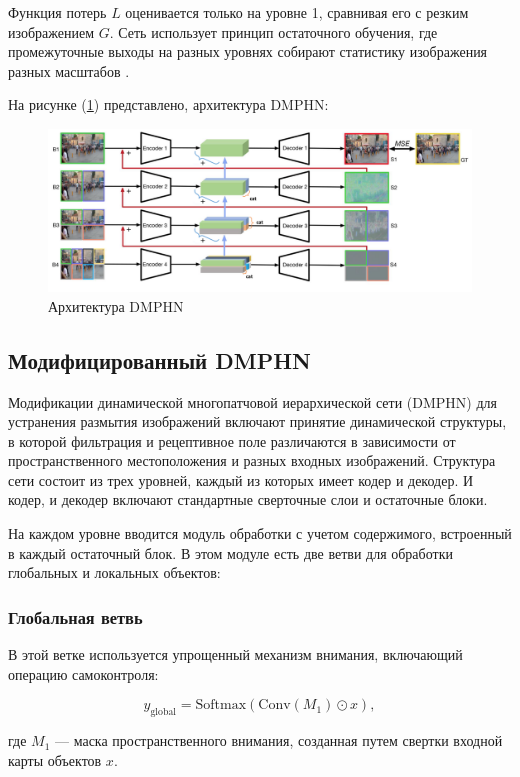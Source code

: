 Функция потерь \(L\) оценивается только на уровне 1, сравнивая его с резким изображением \(G\). Сеть использует принцип остаточного обучения, где промежуточные выходы на разных уровнях собирают статистику изображения разных масштабов \cite{zhang2019deep}.

На рисунке (\ref{fig:dmphn}) представлено, архитектура DMPHN: 
\begin{figure}[H]
	\centering
	\includegraphics[width=0.8\linewidth]{assets/DMPHN.png}
	\caption{Архитектура DMPHN}
	\label{fig:dmphn}
\end{figure}

\subsection{Модифицированный DMPHN}

Модификации динамической многопатчовой иерархической сети (DMPHN) для устранения размытия изображений включают принятие динамической структуры, в которой фильтрация и рецептивное поле различаются в зависимости от пространственного местоположения и разных входных изображений. Структура сети состоит из трех уровней, каждый из которых имеет кодер и декодер. И кодер, и декодер включают стандартные сверточные слои и остаточные блоки.

На каждом уровне вводится модуль обработки с учетом содержимого, встроенный в каждый остаточный блок. В этом модуле есть две ветви для обработки глобальных и локальных объектов:

\subsubsection*{Глобальная ветвь} В этой ветке используется упрощенный механизм внимания, включающий операцию самоконтроля:

\begin{equation}
	y_{\text{global}} = \text{Softmax}(\text{Conv}(M_{1}) \odot x),
\end{equation}

где \(M_{1}\) — маска пространственного внимания, созданная путем свертки входной карты объектов \(x\).

